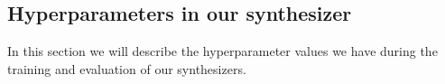 \documentclass{article}
\begin{document}
\subsection{Hyperparameters in our synthesizer} %

In this section we will describe the hyperparameter values we have during the training and evaluation of our synthesizers.

\end{document}
